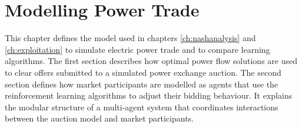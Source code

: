 \chapter{Modelling Power Trade}
\label{ch:method}
This chapter defines the model used in chapters \ref{ch:nashanalysis} and
\ref{ch:exploitation} to simulate electric power trade and to compare learning
algorithms. The first section describes how optimal power flow solutions are
used to clear offers submitted to a simulated power exchange auction.
The second section defines how market participants are modelled as agents that
use the reinforcement learning algorithms to adjust their bidding behaviour. It
explains the modular structure of a multi-agent system that coordinates
interactions between the auction model and market participants.

%
%
